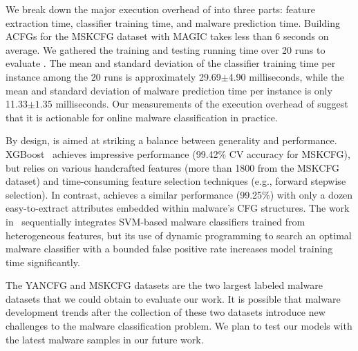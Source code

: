 We break down the major execution overhead of \sysname into three parts: feature extraction time, classifier training time, and malware prediction time.
Building ACFGs for the MSKCFG dataset with MAGIC takes less than 6 seconds on average.
We gathered the training and testing running time over 20 runs to evaluate \sysname.
The mean and standard deviation of the classifier training time per instance among the 20 runs is approximately 29.69$\pm$4.90 milliseconds,
while the mean and standard deviation of malware prediction time per instance is only 11.33$\pm1.35$ milliseconds.
Our measurements of the execution overhead of \sysname suggest that it is actionable for online malware classification in practice.

By design, \sysname is aimed at striking a balance between generality and performance.
XGBoost~\cite{NovelFeatureFusion} achieves impressive performance (99.42\% CV accuracy for MSKCFG), but relies on various handcrafted features (more than 1800 from the MSKCFG dataset) and time-consuming feature selection techniques (e.g., forward stepwise selection).
In contrast, \sysname achieves a similar performance (99.25\%) with only a dozen easy-to-extract attributes embedded within malware’s CFG structures.
The work in~\cite{YanDataset} sequentially integrates SVM-based malware classifiers trained from heterogeneous features,
but its use of dynamic programming to search an optimal malware classifier with a bounded false positive rate increases model training time significantly.

The YANCFG and MSKCFG datasets are the two largest labeled malware datasets that we could obtain to evaluate our work.
It is possible that malware development trends after the collection of these two datasets introduce new challenges to the malware classification problem.
We plan to test our models with the latest malware samples in our future work.


